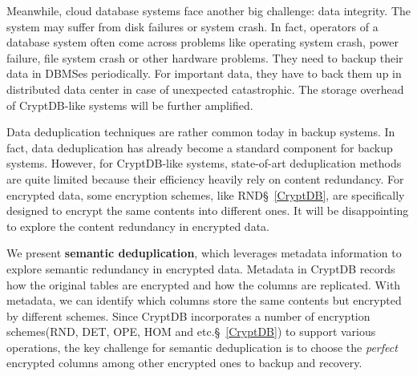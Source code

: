 Meanwhile, cloud database systems face another big challenge: data integrity. The system may suffer from disk failures or system crash. In fact, operators of a database system often come across problems like operating system crash, power failure, file system crash or other hardware problems\citep{mysqlbackupdocumentation}. They need to backup their data in DBMSes periodically. For important data, they have to back them up in distributed data center in case of unexpected catastrophic. The storage overhead of CryptDB-like systems will be further amplified. 



Data deduplication techniques are rather common today in backup systems. In fact, data deduplication has already become a standard component for backup systems\citep{fu2015design}. However, for CryptDB-like systems, state-of-art deduplication methods are quite limited because their efficiency heavily rely on content redundancy. For encrypted data, some encryption schemes, like RND\S~\ref{CryptDB}, are specifically designed to encrypt the same contents into different ones. It will be disappointing to explore the content redundancy in encrypted data. 



We present \textbf{semantic deduplication}, which leverages metadata information to explore semantic redundancy in encrypted data. Metadata in CryptDB records how the original tables are encrypted and how the columns are replicated. With metadata, we can identify which columns store the same contents but encrypted by different schemes. Since CryptDB incorporates a number of encryption schemes(RND, DET, OPE, HOM and etc.\S~\ref{CryptDB}) to support various operations, the key challenge for semantic deduplication is to choose the \textit{perfect} encrypted columns among other encrypted ones to backup and recovery.

